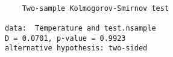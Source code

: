\begin{verbatim} 

	Two-sample Kolmogorov-Smirnov test

data:  Temperature and test.nsample
D = 0.0701, p-value = 0.9923
alternative hypothesis: two-sided

\end{verbatim}